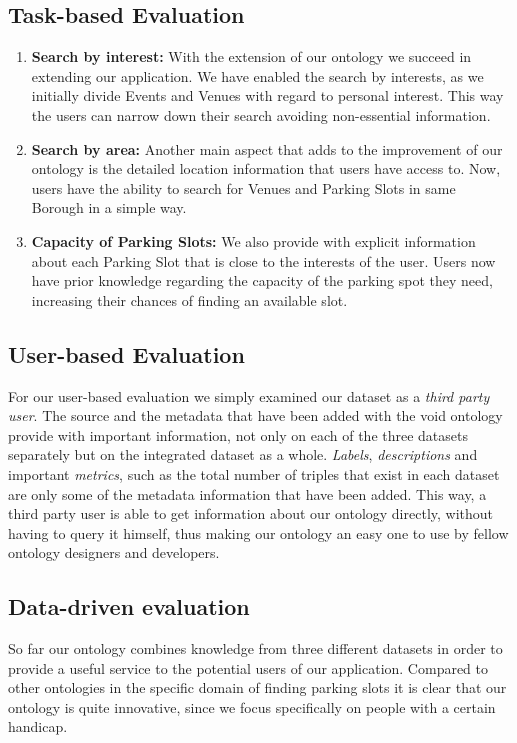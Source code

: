 \documentclass[runningheads,a4paper]{../../StyleFiles/llncs}
\begin{document}
\subsection{Task-based Evaluation}                                                                                                                                                                    
\begin{enumerate}
	\item \textbf{Search by interest:} With the extension of our ontology we succeed in extending our application. We have enabled the search by interests, as we initially divide Events and Venues with regard to personal interest. This way the users can narrow down their search avoiding non-essential information.
	
	\item \textbf{Search by area:} Another main aspect that adds to the improvement of our ontology is the detailed location information that users have access to. Now, users have the ability to search for Venues and Parking Slots in same Borough in a simple way.
	
	\item \textbf{Capacity of Parking Slots:} We also provide with explicit information about each Parking Slot that is close to the interests of the user. Users now have prior knowledge regarding the capacity of the parking spot they need, increasing their chances of finding an available slot.
\end{enumerate}

\subsection{User-based Evaluation}
For our user-based evaluation we simply examined our dataset as a \textit{third party user}. The source and the metadata that have been added with the void ontology provide with important information, not only on each of the three datasets separately but on the integrated dataset as a whole. \textit{Labels}, \textit{descriptions} and important \textit{metrics}, such as the total number of triples that exist in each dataset are only some of the metadata information that have been added. This way, a third party user is able to get information about our ontology directly, without having to query it himself, thus making our ontology an easy one to use by fellow ontology designers and developers.

\subsection{Data-driven evaluation}
So far our ontology combines knowledge from three different datasets in order to provide a useful service to the potential users of our application. Compared to other ontologies in the specific domain of finding parking slots it is clear that our ontology is quite innovative, since we focus specifically on people with a certain handicap. 
\end{document}
